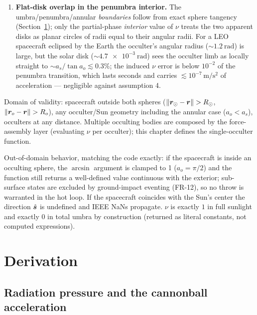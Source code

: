 \begin{enumerate}
    the penumbra illumination fraction is the uncovered \emph{area}
    fraction of a uniformly bright disk (the standard model,
    Montenbruck and Gill~\cite{montenbruck2000}, Sec.~3.4).
  \item \textbf{Flat-disk overlap in the penumbra interior.} The
    umbra/penumbra/annular \emph{boundaries} follow from exact sphere
    tangency (Section~\ref{sec:srp:derivation}); only the partial-phase
    \emph{interior} value of $\nu$ treats the two apparent disks as
    planar circles of radii equal to their angular radii. For a LEO
    spacecraft eclipsed by the Earth the occulter's angular radius
    ($\sim \qty{1.2}{\radian}$) is large, but the solar disk
    ($\sim \qty{4.7e-3}{\radian}$) sees the occulter limb as locally
    straight to $\sim a_{s}/\tan a_{o} \lesssim 0.3\%$; the induced
    $\nu$ error is below $10^{-2}$ of the penumbra transition, which
    lasts seconds and carries $\lesssim 10^{-7}\,\mathrm{m/s^2}$ of
    acceleration --- negligible against assumption 4.
\end{enumerate}

Domain of validity: spacecraft outside both spheres
($\left\lVert \bm{r}_{\odot} - \bm{r} \right\rVert > R_{\odot}$,
$\left\lVert \bm{r}_{o} - \bm{r} \right\rVert > R_{o}$), any occulter/Sun geometry
including the annular case ($a_{o} < a_{s}$), occulters at any distance.
Multiple occulting bodies are composed by the force-assembly layer
(evaluating $\nu$ per occulter); this chapter defines the single-occulter
function.

Out-of-domain behavior, matching the code exactly: if the spacecraft is
inside an occulting sphere, the $\arcsin$ argument is clamped to 1
($a_{o} = \pi/2$) and the function still returns a well-defined value
continuous with the exterior; sub-surface states are excluded by
ground-impact eventing (FR-12), so no throw is warranted in the hot
loop. If the spacecraft coincides with the Sun's center the direction
$\hat{\bm{s}}$ is undefined and IEEE NaNs propagate. $\nu$ is exactly
$1$ in full sunlight and exactly $0$ in total umbra by construction
(returned as literal constants, not computed expressions).

\section{Derivation}
\label{sec:srp:derivation}

\subsection{Radiation pressure and the cannonball acceleration}

